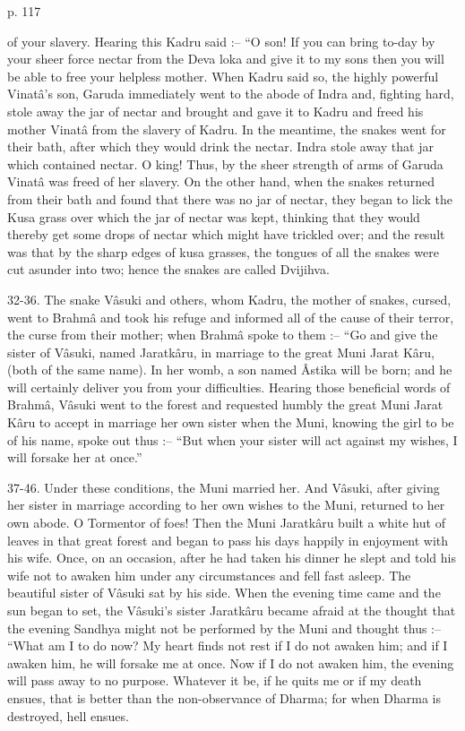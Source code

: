  

p. 117

 

of your slavery. Hearing this Kadru said :-- “O son! If you can bring to-day by your sheer force nectar from the Deva loka and give it to my sons then you will be able to free your helpless mother. When Kadru said so, the highly powerful Vinatâ's son, Garuda immediately went to the abode of Indra and, fighting hard, stole away the jar of nectar and brought and gave it to Kadru and freed his mother Vinatâ from the slavery of Kadru. In the meantime, the snakes went for their bath, after which they would drink the nectar. Indra stole away that jar which contained nectar. O king! Thus, by the sheer strength of arms of Garuda Vinatâ was freed of her slavery. On the other hand, when the snakes returned from their bath and found that there was no jar of nectar, they began to lick the Kusa grass over which the jar of nectar was kept, thinking that they would thereby get some drops of nectar which might have trickled over; and the result was that by the sharp edges of kusa grasses, the tongues of all the snakes were cut asunder into two; hence the snakes are called Dvijihva.

 

32-36. The snake Vâsuki and others, whom Kadru, the mother of snakes, cursed, went to Brahmâ and took his refuge and informed all of the cause of their terror, the curse from their mother; when Brahmâ spoke to them :-- “Go and give the sister of Vâsuki, named Jaratkâru, in marriage to the great Muni Jarat Kâru, (both of the same name). In her womb, a son named Âstika will be born; and he will certainly deliver you from your difficulties. Hearing those beneficial words of Brahmâ, Vâsuki went to the forest and requested humbly the great Muni Jarat Kâru to accept in marriage her own sister when the Muni, knowing the girl to be of his name, spoke out thus :-- “But when your sister will act against my wishes, I will forsake her at once.”

 

37-46. Under these conditions, the Muni married her. And Vâsuki, after giving her sister in marriage according to her own wishes to the Muni, returned to her own abode. O Tormentor of foes! Then the Muni Jaratkâru built a white hut of leaves in that great forest and began to pass his days happily in enjoyment with his wife. Once, on an occasion, after he had taken his dinner he slept and told his wife not to awaken him under any circumstances and fell fast asleep. The beautiful sister of Vâsuki sat by his side. When the evening time came and the sun began to set, the Vâsuki's sister Jaratkâru became afraid at the thought that the evening Sandhya might not be performed by the Muni and thought thus :-- “What am I to do now? My heart finds not rest if I do not awaken him; and if I awaken him, he will forsake me at once. Now if I do not awaken him, the evening will pass away to no purpose. Whatever it be, if he quits me or if my death ensues, that is better than the non-observance of Dharma; for when Dharma is destroyed, hell ensues.

